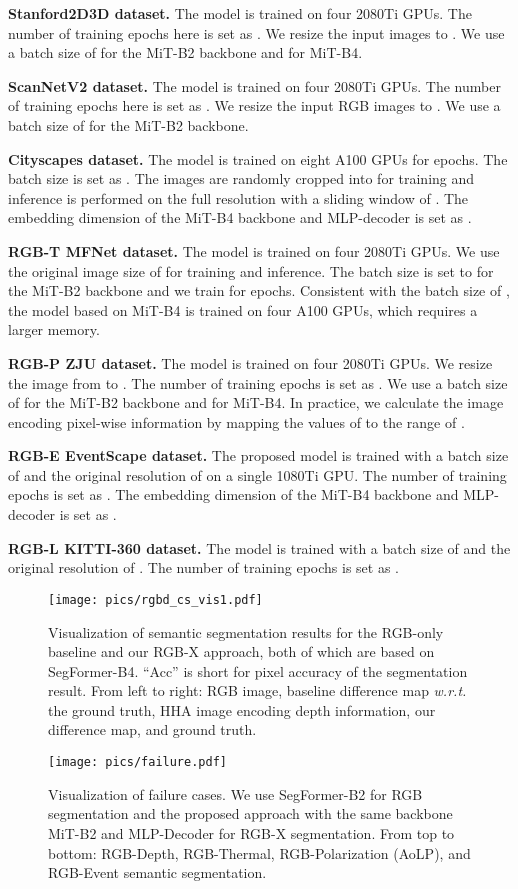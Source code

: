 \documentclass[journal]{IEEEtran}
\begin{document}
\noindent\textbf{Stanford2D3D dataset.} The model is trained on four 2080Ti GPUs. The number of training epochs here is set as . We resize the input images to . We use a batch size of  for the MiT-B2 backbone and  for MiT-B4.

\noindent\textbf{ScanNetV2 dataset.} The model is trained on four 2080Ti GPUs. The number of training epochs here is set as . We resize the input RGB images to . We use a batch size of  for the MiT-B2 backbone.

\noindent\textbf{Cityscapes dataset.} The model is trained on eight A100 GPUs for  epochs. The batch size is set as . The images are randomly cropped into  for training and inference is performed on the full resolution with a sliding window of . The embedding dimension of the MiT-B4 backbone and MLP-decoder is set as .

\noindent\textbf{RGB-T MFNet dataset.} The model is trained on four 2080Ti GPUs. We use the original image size of  for training and inference. The batch size is set to  for the MiT-B2 backbone and we train for  epochs.
Consistent with the batch size of , the model based on MiT-B4 is trained on four A100 GPUs, which requires a larger memory.

\noindent\textbf{RGB-P ZJU dataset.} The model is trained on four 2080Ti GPUs. We resize the image from  to . The number of training epochs is set as . We use a batch size of  for the MiT-B2 backbone and  for MiT-B4. In practice, we calculate the image encoding pixel-wise  information by mapping the values of  to the range of .

\noindent\textbf{RGB-E EventScape dataset.} The proposed model is trained with a batch size of  and the original resolution of  on a single 1080Ti GPU. The number of training epochs is set as . The embedding dimension of the MiT-B4 backbone and MLP-decoder is set as .

\noindent\textbf{RGB-L KITTI-360 dataset.} The model is trained with a batch size of  and the original resolution of . The number of training epochs is set as . 

\begin{figure*}[!t]
    \centering
    \texttt{[image: pics/rgbd\_cs\_vis1.pdf]}
\caption{Visualization of semantic segmentation results for the RGB-only baseline and our RGB-X approach, both of which are based on SegFormer-B4. ``Acc'' is short for pixel accuracy of the segmentation result. From left to right: RGB image, baseline difference map \textit{w.r.t.} the ground truth, HHA image encoding depth information, our difference map, and ground truth.}
    \label{fig:cs_vis}
\end{figure*}
\begin{figure*}[!t]
    \centering
        \texttt{[image: pics/failure.pdf]}
\caption{Visualization of failure cases. We use SegFormer-B2 for RGB segmentation and the proposed approach with the same backbone MiT-B2 and MLP-Decoder for RGB-X segmentation. From top to bottom: RGB-Depth, RGB-Thermal, RGB-Polarization (AoLP), and RGB-Event semantic segmentation.}
    \label{fig:failure_cases}
\end{figure*}
\end{document}
